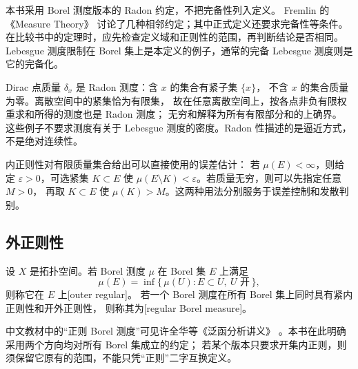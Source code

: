 本书采用 Borel 测度版本的 Radon 约定，不把完备性列入定义。
Fremlin 的《Measure Theory》\cite[411B, 411H, and notes to \S411]{Fremlin2016Measure}
讨论了几种相邻约定；其中正式定义还要求完备性等条件。
在比较书中的定理时，应先检查定义域和正则性的范围，再判断结论是否相同。
Lebesgue 测度限制在 Borel 集上是本定义的例子，通常的完备 Lebesgue 测度则是它的完备化。

\ProseParagraphBreak

Dirac 点质量 \(\delta_x\) 是 Radon 测度：含 \(x\) 的集合有紧子集 \(\{x\}\)，
不含 \(x\) 的集合质量为零。离散空间中的紧集恰为有限集，
故在任意离散空间上，按各点非负有限权重求和所得的测度也是 Radon 测度；
无穷和解释为所有有限部分和的上确界。
这些例子不要求测度有关于 Lebesgue 测度的密度。Radon 性描述的是逼近方式，不是绝对连续性。

\ProseParagraphBreak

内正则性对有限质量集合给出可以直接使用的误差估计：
若 \(\mu(E)<\infty\)，则给定 \(\varepsilon>0\)，可选紧集 \(K\subset E\) 使
\(\mu(E\setminus K)<\varepsilon\)。若质量无穷，则可以先指定任意 \(M>0\)，
再取 \(K\subset E\) 使 \(\mu(K)>M\)。这两种用法分别服务于误差控制和发散判别。

\subsection{外正则性}
\label{b1:subsec:110203}

\begin{definition}\label{b1:def:outer-regular-borel}
设 \(X\) 是拓扑空间。若 Borel 测度 \(\mu\) 在 Borel 集 \(E\) 上满足
\[
 \mu(E)=\inf\{\,\mu(U):E\subset U,\ U\text{ 开}\,\},
\]
则称它在 \(E\) 上[outer regular]。
若一个 Borel 测度在所有 Borel 集上同时具有紧内正则性和开外正则性，
则称其为[regular Borel measure]。
\end{definition}

中文教材中的“正则 Borel 测度”可见许全华等《泛函分析讲义》%
\cite[第10章]{Xu2017Fanhan}。本书在此明确采用两个方向均对所有 Borel 集成立的约定；
若某个版本只要求开集内正则，则须保留它原有的范围，不能只凭“正则”二字互换定义。

